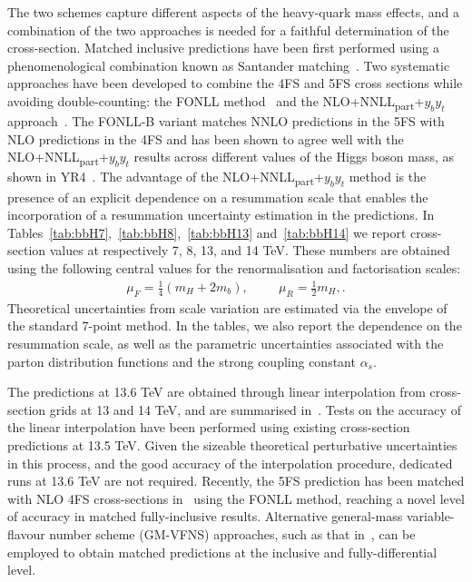 The two schemes capture different aspects of the heavy-quark mass effects, and a combination of the two approaches is needed for a faithful determination of the cross-section. Matched inclusive predictions have been first performed using a phenomenological combination known as Santander matching~\cite{Harlander:2011aa}. Two systematic approaches have been developed to combine the 4FS and 5FS cross sections while avoiding double-counting: the FONLL method~\cite{Forte:2015hba,Forte:2016sja} and the NLO+NNLL\textsubscript{part}+$y_b y_t$ approach~\cite{Bonvini:2015pxa,Bonvini:2016fgf}. The FONLL-B variant matches NNLO predictions in the 5FS with NLO predictions in the 4FS and has been shown to agree well with the NLO+NNLL\textsubscript{part}+$y_b y_t$ results across different values of the Higgs boson mass, as shown in YR4~\cite{LHCHiggsCrossSectionWorkingGroup:2016ypw}. The advantage of the NLO+NNLL\textsubscript{part}+$y_b y_t$ method is the presence of an explicit dependence on a resummation scale that enables the incorporation of a resummation uncertainty estimation in the predictions. In Tables~\ref{tab:bbH7},~\ref{tab:bbH8},~\ref{tab:bbH13} and~\ref{tab:bbH14} we report cross-section values at respectively 7, 8, 13, and 14 TeV. These numbers are obtained using the following central values for the renormalisation and factorisation scales:
\begin{align}
\mu_{F}=\frac{1}{4}(m_H+2m_b),\hspace{1cm}\mu_R=\frac{1}{2}m_H,.
\end{align}
Theoretical uncertainties from scale variation are estimated via the envelope of the standard 7-point method. In the tables, we also report the dependence on the resummation scale, as well as the parametric uncertainties associated with the parton distribution functions and the strong coupling constant $\alpha_s$.

The predictions at 13.6 TeV are obtained through linear interpolation from cross-section grids at 13 and 14 TeV, and are summarised in~. Tests on the accuracy of the linear interpolation have been performed using existing cross-section predictions at 13.5 TeV. Given the sizeable theoretical perturbative uncertainties in this process, and the good accuracy of the interpolation procedure, dedicated runs at 13.6 TeV are not required. Recently, the \nnnlo{} 5FS prediction has been matched with NLO 4FS cross-sections in~ using the FONLL method, reaching a novel level of accuracy in matched fully-inclusive results. Alternative general-mass variable-flavour number scheme (GM-VFNS) approaches, such as that in~, can be employed to obtain matched predictions at the inclusive and fully-differential level.

